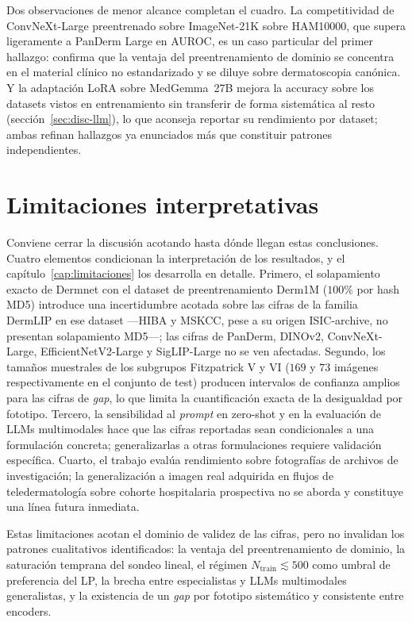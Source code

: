 Dos observaciones de menor alcance completan el cuadro. La
competitividad de ConvNeXt-Large preentrenado sobre ImageNet-21K sobre
HAM10000, que supera ligeramente a PanDerm Large en AUROC, es un caso
particular del primer hallazgo: confirma que la ventaja del
preentrenamiento de dominio se concentra en el material clínico no
estandarizado y se diluye sobre dermatoscopia canónica. Y la adaptación
LoRA sobre MedGemma~27B mejora la accuracy sobre los datasets vistos en
entrenamiento sin transferir de forma sistemática al resto
(sección~\ref{sec:disc-llm}), lo que aconseja reportar su rendimiento por
dataset; ambas refinan hallazgos ya enunciados más que constituir patrones
independientes.

\section{Limitaciones interpretativas}
\label{sec:disc-limitaciones}

Conviene cerrar la discusión acotando hasta dónde llegan estas
conclusiones. Cuatro elementos condicionan la interpretación de los
resultados, y el capítulo~\ref{cap:limitaciones} los desarrolla en
detalle. Primero, el solapamiento exacto de Dermnet con el dataset de
preentrenamiento Derm1M ($100\%$ por hash MD5) introduce una
incertidumbre acotada sobre las cifras de la familia DermLIP en ese
dataset ---HIBA y MSKCC, pese a su origen ISIC-archive, no presentan
solapamiento MD5---; las cifras de PanDerm, DINOv2, ConvNeXt-Large,
EfficientNetV2-Large y SigLIP-Large no se ven afectadas. Segundo, los
tamaños muestrales de los subgrupos Fitzpatrick V y VI ($169$ y
$73$ imágenes respectivamente en el conjunto de test) producen
intervalos de confianza amplios para las cifras de \emph{gap}, lo que
limita la cuantificación exacta de la desigualdad por fototipo.
Tercero, la sensibilidad al \emph{prompt} en zero-shot y en la
evaluación de LLMs multimodales hace que las cifras reportadas sean
condicionales a una formulación concreta; generalizarlas a otras
formulaciones requiere validación específica. Cuarto, el trabajo
evalúa rendimiento sobre fotografías de archivos de investigación; la
generalización a imagen real adquirida en flujos de teledermatología
sobre cohorte hospitalaria prospectiva no se aborda y constituye una
línea futura inmediata.

Estas limitaciones acotan el dominio de validez de las cifras, pero
no invalidan los patrones cualitativos identificados: la ventaja del
preentrenamiento de dominio, la saturación temprana del sondeo
lineal, el régimen $N_{\mathrm{train}} \lesssim 500$ como umbral de
preferencia del LP, la brecha entre especialistas y LLMs
multimodales generalistas, y la existencia de un \emph{gap} por
fototipo sistemático y consistente entre encoders.
